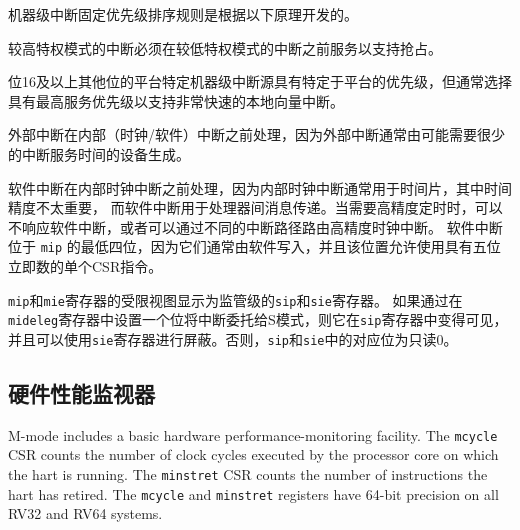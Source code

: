 \begin{commentary}

  机器级中断固定优先级排序规则是根据以下原理开发的。

  较高特权模式的中断必须在较低特权模式的中断之前服务以支持抢占。

  位16及以上其他位的平台特定机器级中断源具有特定于平台的优先级，但通常选择具有最高服务优先级以支持非常快速的本地向量中断。

  外部中断在内部（时钟/软件）中断之前处理，因为外部中断通常由可能需要很少的中断服务时间的设备生成。

  软件中断在内部时钟中断之前处理，因为内部时钟中断通常用于时间片，其中时间精度不太重要，
  而软件中断用于处理器间消息传递。当需要高精度定时时，可以不响应软件中断，或者可以通过不同的中断路径路由高精度时钟中断。
  软件中断位于 {\tt mip} 的最低四位，因为它们通常由软件写入，并且该位置允许使用具有五位立即数的单个CSR指令。
\end{commentary}

\iffalse
Restricted views of the {\tt mip} and {\tt mie} registers appear as
the {\tt sip} and {\tt sie} registers for supervisor level.
If an interrupt is delegated to
S-mode by setting a bit in the {\tt mideleg} register,
it becomes visible in the {\tt sip} register and is maskable
using the {\tt sie} register.  Otherwise, the corresponding
bits in {\tt sip} and {\tt sie} are read-only
zero.
\fi

{\tt mip}和{\tt mie}寄存器的受限视图显示为监管级的{\tt sip}和{\tt sie}寄存器。 
如果通过在{\tt mideleg}寄存器中设置一个位将中断委托给S模式，则它在{\tt sip}寄存器中变得可见，
并且可以使用{\tt sie}寄存器进行屏蔽。否则，{\tt sip}和{\tt sie}中的对应位为只读0。

\subsection{硬件性能监视器}

\iffalse
M-mode includes a basic hardware performance-monitoring facility.  The
{\tt mcycle} CSR counts the number of clock cycles executed by the
processor core on which the hart is running.
The {\tt minstret} CSR counts the number of instructions the hart has
retired.  The {\tt mcycle} and {\tt minstret} registers have 64-bit
precision on all RV32 and RV64 systems.

